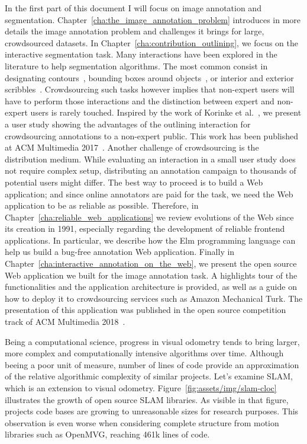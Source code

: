 In the first part of this document I will focus on image annotation and segmentation.
Chapter~\ref{cha:the_image_annotation_problem} introduces in more details
the image annotation problem and challenges it brings for large, crowdsourced datasets.
In Chapter~\ref{cha:contribution_outlining}, we focus on the interactive segmentation task.
Many interactions have been explored in the literature to help segmentation algorithms.
The most common consist in designating contours~\cite{russell2008labelme},
bounding boxes around objects~\cite{rother_grabcut:_2004},
or interior and exterior scribbles~\cite{mcguinness2010comparative}.
Crowdsourcing such tasks however implies that non-expert users will have to perform
those interactions and the distinction between expert and non-expert users is rarely touched.
Inspired by the work of Korinke et al.~\cite{korinke_intuitive_2015, korinke_exploring_2015},
we present a user study showing the advantages of the outlining interaction
for crowdsourcing annotations to a non-expert public.
This work has been published at ACM Multimedia 2017~\cite{pizenberg2017outlining}.
Another challenge of crowdsourcing is the distribution medium.
While evaluating an interaction in a small user study does not require complex setup,
distributing an annotation campaign to thousands of potential users might differ.
The best way to proceed is to build a Web application;
and since online annotators are paid for the task,
we need the Web application to be as reliable as possible.
Therefore, in Chapter~\ref{cha:reliable_web_applications} we review evolutions of the Web
since its creation in 1991, especially regarding the development
of reliable frontend applications.
In particular, we describe how the Elm programming language can help us
build a bug-free annotation Web application.
Finally in Chapter~\ref{cha:interactive_annotation_on_the_web},
we present the open source Web application we built for the image annotation task.
A highlights tour of the functionalities and the application architecture is provided,
as well as a guide on how to deploy it to crowdsourcing services
such as Amazon Mechanical Turk.
The presentation of this application was published in the open source competition track
of ACM Multimedia 2018~\cite{pizenberg2018annotation}.


Being a computational science, progress in visual odometry tends to bring larger,
more complex and computationally intensive algorithms over time.
Although beeing a poor unit of measure, number of lines of code provide
an approximation of the relative algorithmic complexity of similar projects.
Let's examine SLAM, which is an extension to visual odometry.
Figure~\ref{fig:assets/img/slam-cloc} illustrates the growth of open source SLAM libraries.
As visible in that figure, projects code bases are growing to unreasonable sizes for research purposes.
This observation is even worse when considering complete structure from motion
libraries such as OpenMVG, reaching 461k lines of code.

